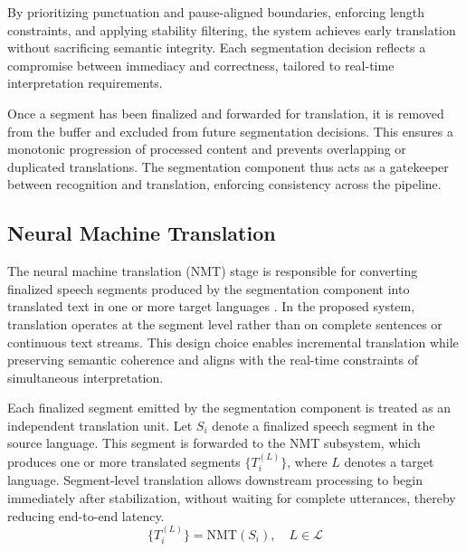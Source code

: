 By prioritizing punctuation and pause-aligned boundaries, enforcing length constraints, and applying stability filtering, the system achieves early translation without sacrificing semantic integrity. Each segmentation decision reflects a compromise between immediacy and correctness, tailored to real-time interpretation requirements.

Once a segment has been finalized and forwarded for translation, it is removed from the buffer and excluded from future segmentation decisions. This ensures a monotonic progression of processed content and prevents overlapping or duplicated translations. The segmentation component thus acts as a gatekeeper between recognition and translation, enforcing consistency across the pipeline.


\subsection{Neural Machine Translation}

The neural machine translation (NMT) stage is responsible for converting finalized speech segments produced by the segmentation component into translated text in one or more target languages \cite{stahlberg2020nmt_review}. In the proposed system, translation operates at the segment level rather than on complete sentences or continuous text streams. This design choice enables incremental translation while preserving semantic coherence and aligns with the real-time constraints of simultaneous interpretation.

Each finalized segment emitted by the segmentation component is treated as an independent translation unit. Let $S_i$ denote a finalized speech segment in the source language. This segment is forwarded to the NMT subsystem, which produces one or more translated segments $\{T_i^{(L)}\}$, where $L$ denotes a target language. Segment-level translation allows downstream processing to begin immediately after stabilization, without waiting for complete utterances, thereby reducing end-to-end latency.
\[
\{T_i^{(L)}\} = \text{NMT}(S_i), \quad L \in \mathcal{L}
\]

